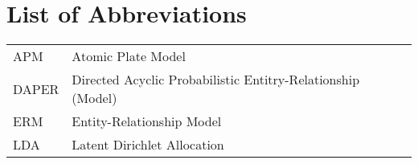 \section*{List of Abbreviations}

\begin{tabular}{ll}
APM & Atomic Plate Model\\
DAPER & Directed Acyclic Probabilistic Entitry-Relationship (Model)\\
ERM & Entity-Relationship Model\\
LDA & Latent Dirichlet Allocation
\end{tabular}